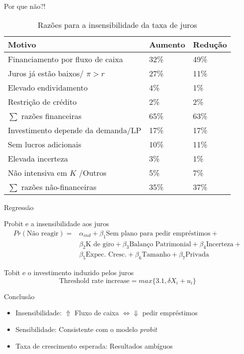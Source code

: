 \documentclass[presentation]{beamer}
\begin{document}
\begin{frame}[label={sec:org5820c1e}]{Por que não?!}
\begin{table}[htbp]
\caption{Razões para a insensibilidade da taxa de juros}
\centering
\begin{tabular}{lll}
\hline
Motivo & Aumento & Redução\\
\hline
Financiamento por fluxo de caixa & 32\% & 49\%\\
Juros já estão baixos/ \(\pi > r\) & 27\% & 11\%\\
Elevado endividamento & 4\% & 1\%\\
Restrição de crédito & 2\% & 2\%\\
\hline
\(\sum\) razões financeiras & 65\% & 63\%\\
\hline
Investimento depende da demanda/LP & 17\% & 17\%\\
Sem lucros adicionais & 10\% & 11\%\\
Elevada incerteza & 3\% & 1\%\\
Não intensiva em \(K\) /Outros & 5\% & 7\%\\
\hline
\(\sum\) razões não-financeiras & 35\% & 37\%\\
\hline
\end{tabular}
\end{table}
\end{frame}
\begin{frame}[label={sec:org71b0a42}]{Regressão}
\begin{block}{Probit e a insensibilidade aos juros}
\begin{align*}
Pr(\text{Não reagir}) =& \alpha_{ind} + \beta_{1}\text{Sem plano para pedir empréstimos} + \\
& \beta_{2}\text{K de giro} + \beta_{3}\text{Balanço Patrimonial} + \beta_{4}\text{Incerteza} + \\
& \beta_{5}\text{Expec. Cresc.} + \beta_{6}\text{Tamanho} + \beta_{7}\text{Privada}
\end{align*}
\end{block}
\begin{block}{Tobit e o investimento induzido pelos juros}
$$
\text{Threshold rate increase} = max\{3.1, \delta X_{i} + u_{i}\}
$$
\end{block}
\begin{block}{Conclusão}
\begin{itemize}
\item \alert{Insensibilidade:} \(\Uparrow\) Fluxo de caixa \(\Leftrightarrow \Downarrow\) pedir empréstimos
\item \alert{Sensibilidade:} Consistente com o modelo \emph{probit}
\item \alert{Taxa de crescimento esperada:} Resultados ambíguos
\end{itemize}
\end{block}
\end{frame}
\end{document}
